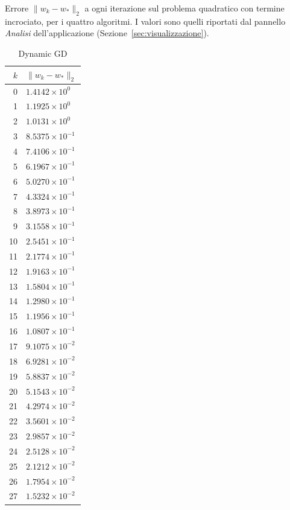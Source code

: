 \documentclass[italian, a4paper, twoside, binding=6mm]{sapthesis}
\begin{document}
\begin{table}[H]
\centering
\footnotesize
\renewcommand{\arraystretch}{0.85}
\setlength{\tabcolsep}{3pt}
\caption{Errore $\|w_k-w_*\|_2$ a ogni iterazione sul problema quadratico con termine incrociato, per i quattro algoritmi. I valori sono quelli riportati dal pannello \emph{Analisi} dell'applicazione (Sezione~\ref{sec:visualizzazione}).}
\label{tab:test_incrociato}
\begin{subtable}{0.24\textwidth}
\centering
\caption{Dynamic GD}
\begin{tabular}{@{}rl@{}}
\toprule
$k$ & $\|w_k-w_*\|_2$\\
\midrule
0 & $1.4142\times10^{0}$\\
1 & $1.1925\times10^{0}$\\
2 & $1.0131\times10^{0}$\\
3 & $8.5375\times10^{-1}$\\
4 & $7.4106\times10^{-1}$\\
5 & $6.1967\times10^{-1}$\\
6 & $5.0270\times10^{-1}$\\
7 & $4.3324\times10^{-1}$\\
8 & $3.8973\times10^{-1}$\\
9 & $3.1558\times10^{-1}$\\
10 & $2.5451\times10^{-1}$\\
11 & $2.1774\times10^{-1}$\\
12 & $1.9163\times10^{-1}$\\
13 & $1.5804\times10^{-1}$\\
14 & $1.2980\times10^{-1}$\\
15 & $1.1956\times10^{-1}$\\
16 & $1.0807\times10^{-1}$\\
17 & $9.1075\times10^{-2}$\\
18 & $6.9281\times10^{-2}$\\
19 & $5.8837\times10^{-2}$\\
20 & $5.1543\times10^{-2}$\\
21 & $4.2974\times10^{-2}$\\
22 & $3.5601\times10^{-2}$\\
23 & $2.9857\times10^{-2}$\\
24 & $2.5128\times10^{-2}$\\
25 & $2.1212\times10^{-2}$\\
26 & $1.7954\times10^{-2}$\\
27 & $1.5232\times10^{-2}$\\

\end{tabular}
\end{subtable}
\end{table}
\end{document}
